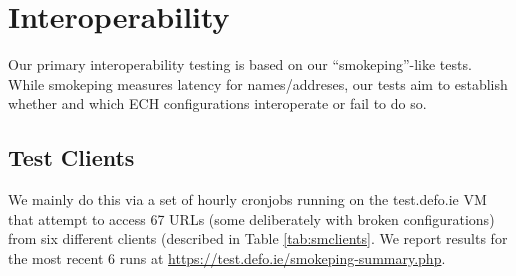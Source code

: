 \section{Interoperability}

Our primary interoperability testing is based on our ``smokeping''-like tests.
While smokeping measures latency for names/addreses, our tests aim to establish
whether and which ECH configurations interoperate or fail to do so.

\subsection{Test Clients}

We mainly do this via a set of hourly cronjobs running on the test.defo.ie VM
that attempt to access 67 URLs (some deliberately with broken configurations)
from six different clients (described in Table \ref{tab:smclients}. We report
results for the most recent 6 runs at
\url{https://test.defo.ie/smokeping-summary.php}.

